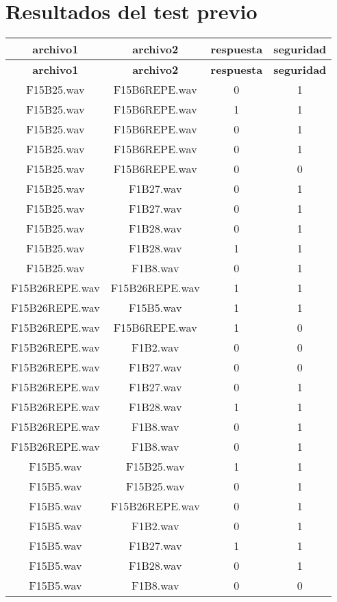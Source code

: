 \documentclass[11pt,a4paper,twoside]{book}
\begin{document}
\section{Resultados del test previo}
\scriptsize
\begin{longtable}[c]{|c|c|c|c|}
		\hline
		\textbf{archivo1}&\textbf{archivo2}&\textbf{respuesta}&\textbf{seguridad}\\ \hline
		\endfirsthead
		\hline
		\textbf{archivo1}&\textbf{archivo2}&\textbf{respuesta}&\textbf{seguridad}\\ \hline
		\endhead
		
		F15B25.wav&F15B6REPE.wav&0&1\\ \hline
F15B25.wav&F15B6REPE.wav&1&1\\ \hline
F15B25.wav&F15B6REPE.wav&0&1\\ \hline
F15B25.wav&F15B6REPE.wav&0&1\\ \hline
F15B25.wav&F15B6REPE.wav&0&0\\ \hline
F15B25.wav&F1B27.wav&0&1\\ \hline
F15B25.wav&F1B27.wav&0&1\\ \hline
F15B25.wav&F1B28.wav&0&1\\ \hline
F15B25.wav&F1B28.wav&1&1\\ \hline
F15B25.wav&F1B8.wav&0&1\\ \hline
F15B26REPE.wav&F15B26REPE.wav&1&1\\ \hline
F15B26REPE.wav&F15B5.wav&1&1\\ \hline
F15B26REPE.wav&F15B6REPE.wav&1&0\\ \hline
F15B26REPE.wav&F1B2.wav&0&0\\ \hline
F15B26REPE.wav&F1B27.wav&0&0\\ \hline
F15B26REPE.wav&F1B27.wav&0&1\\ \hline
F15B26REPE.wav&F1B28.wav&1&1\\ \hline
F15B26REPE.wav&F1B8.wav&0&1\\ \hline
F15B26REPE.wav&F1B8.wav&0&1\\ \hline
F15B5.wav&F15B25.wav&1&1\\ \hline
F15B5.wav&F15B25.wav&0&1\\ \hline
F15B5.wav&F15B26REPE.wav&0&1\\ \hline
F15B5.wav&F1B2.wav&0&1\\ \hline
F15B5.wav&F1B27.wav&1&1\\ \hline
F15B5.wav&F1B28.wav&0&1\\ \hline
F15B5.wav&F1B8.wav&0&0\\ \hline

\end{longtable}
\end{document}
